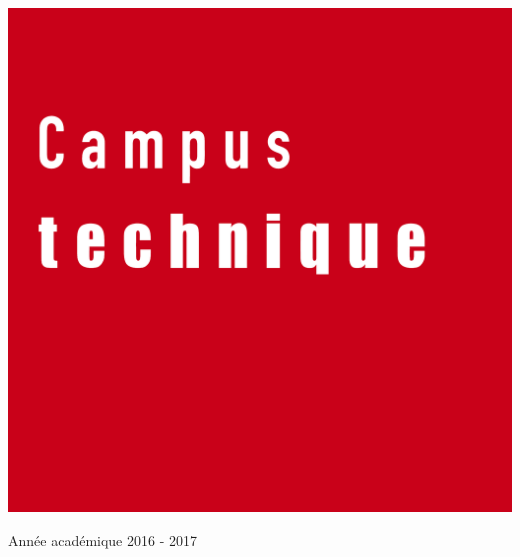 \begin{center}
  \vspace{2.5cm}

  \includegraphics[scale=0.08]{textures/logo/technical.pdf}

  \vspace{0.5cm}

  Année académique 2016 - 2017
\end{center}

\thispagestyle{empty}